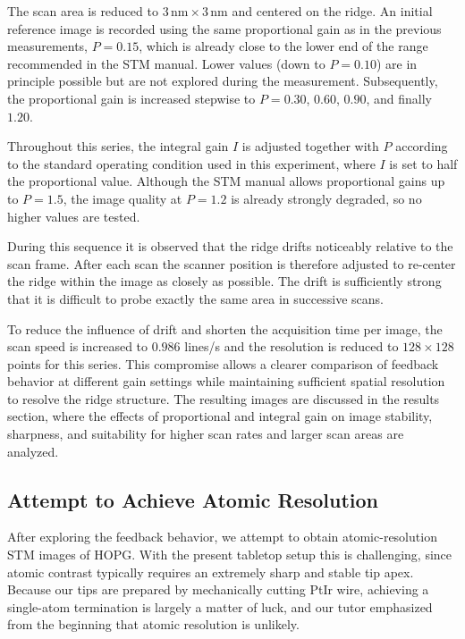 \documentclass[a4paper]{article}
\begin{document}
The scan area is reduced to $3\,\text{nm} \times 3\,\text{nm}$ and centered on the ridge.
An initial reference image is recorded using the same proportional gain as in the previous measurements, $P = 0.15$, which is already close to the lower end of the range recommended in the STM manual.
Lower values (down to $P=0.10$) are in principle possible but are not explored during the measurement.
Subsequently, the proportional gain is increased stepwise to $P = 0.30$, $0.60$, $0.90$, and finally $1.20$.

Throughout this series, the integral gain $I$ is adjusted together with $P$ according to the standard operating condition used in this experiment, where $I$ is set to half the proportional value.
Although the STM manual allows proportional gains up to $P = 1.5$, the image quality at $P = 1.2$ is already strongly degraded, so no higher values are tested.

During this sequence it is observed that the ridge drifts noticeably relative to the scan frame.
After each scan the scanner position is therefore adjusted to re-center the ridge within the image as closely as possible.
The drift is sufficiently strong that it is difficult to probe exactly the same area in successive scans.

To reduce the influence of drift and shorten the acquisition time per image, the scan speed is increased to $0.986$ lines/s and the resolution is reduced to $128 \times 128$ points for this series.
This compromise allows a clearer comparison of feedback behavior at different gain settings while maintaining sufficient spatial resolution to resolve the ridge structure.
The resulting images are discussed in the results section, where the effects of proportional and integral gain on image stability, sharpness, and suitability for higher scan rates and larger scan areas are analyzed.

\subsection{Attempt to Achieve Atomic Resolution}

After exploring the feedback behavior, we attempt to obtain atomic-resolution STM images of HOPG.
With the present tabletop setup this is challenging, since atomic contrast typically requires an extremely sharp and stable tip apex.
Because our tips are prepared by mechanically cutting PtIr wire, achieving a single-atom termination is largely a matter of luck, and our tutor emphasized from the beginning that atomic resolution is unlikely.
\end{document}
